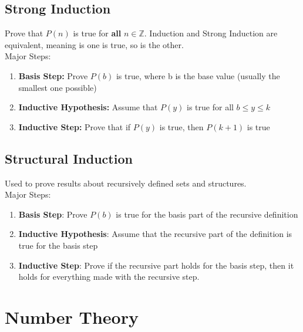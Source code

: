\documentclass[letter]{article}
\begin{document}
\begin{multicols}{2}
  \subsection{Strong Induction} 
  Prove that $P(n)$ is true for \textbf{all} $n \in \mathbb{Z}$. Induction and
  Strong Induction are equivalent, meaning is one is true, so is the other. \\
  Major Steps:
  \begin{enumerate} 
    \item \textbf{Basis Step:} Prove $P(b)$ is true, where b is the base value
          (usually the smallest one possible)
    \item \textbf{Inductive Hypothesis:} Assume that $P(y)$ is true for all
          $b \leq y \leq k$
    \item \textbf{Inductive Step:} Prove that if $P(y)$ is true, then $P(k + 1)$
          is true
  \end{enumerate}

  \subsection{Structural Induction} 
  Used to prove results about recursively defined sets and structures. \\
  Major Steps:
  \begin{enumerate} 
    \item \textbf{Basis Step}: Prove $P(b)$ is true for the basis part of the
          recursive definition
    \item \textbf{Inductive Hypothesis}: Assume that the recursive part of the
          definition is true for the basis step
    \item \textbf{Inductive Step}: Prove if the recursive part holds for the
          basis step, then it holds for everything made with the recursive step.
  \end{enumerate}

  \section{Number Theory} 

\end{multicols}
\end{document}
